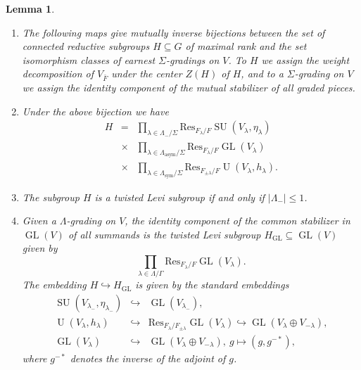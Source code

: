 \documentclass{article}
\def\tx#1{\textrm{#1}}
\DeclareMathOperator{\GL}{GL}
\newtheorem{lem}[thm]{Lemma}
\theoremstyle{definition}
\numberwithin{equation}{subsection}
\renewcommand{\-}{\hyp{}}
\DeclareMathOperator{\SU}{SU}
\DeclareMathOperator{\U}{U}
\begin{document}
\begin{lem}\label{lem:Levivsgrading}
	\begin{enumerate}
		\item The following maps give mutually inverse bijections between the set of connected reductive subgroups $H \subseteq G$ of maximal rank and the set isomorphism classes of earnest $\Sigma$-gradings on $V$. To $H$ we assign the weight decomposition of $V_{\bar F}$ under the center $Z(H)$ of $H$, and to a $\Sigma$-grading on $V$ we assign the identity component of the mutual stabilizer of all graded pieces.
		\item Under the above bijection we have 
\begin{eqnarray*}
			H&=&\prod_{\lambda \in \Lambda_-/\Sigma} \tx{Res}_{F_\lambda/F}\SU(V_{\lambda},\eta_{\lambda})\\
			&\times&\prod_{\lambda \in \Lambda_\tx{asym}/\Sigma} \tx{Res}_{F_\lambda/F}\GL(V_\lambda)\\
			&\times&\prod_{\lambda \in \Lambda_\tx{sym}/\Sigma} \tx{Res}_{F_{\pm\lambda}/F}\U(V_{\lambda},h_{\lambda}).
		\end{eqnarray*}
\item The subgroup $H$ is a twisted Levi subgroup if and only if $|\Lambda_-| \leq 1$.
		\item Given a $\Lambda$-grading on $V$, the identity component of the common stabilizer in $\GL(V)$ of all summands is the twisted Levi subgroup $H_{\GL} \subseteq \GL(V)$ given by 
		\[ \prod_{\lambda \in \Lambda/\Gamma} \tx{Res}_{F_\lambda/F}\GL(V_\lambda). \]
		The embedding $H \hookrightarrow H_{\GL}$ is given by the standard embeddings
		\begin{eqnarray*}
			\SU(V_{\lambda_-},\eta_{\lambda_-})&\hookrightarrow&\GL(V_{\lambda_-}),\\
			\U(V_{\lambda},h_{\lambda})&\hookrightarrow&\tx{Res}_{F_\lambda/F_{\pm\lambda}}\GL(V_{\lambda}) \hookrightarrow \GL(V_\lambda \oplus V_{-\lambda}),\\
			\GL(V_\lambda)&\hookrightarrow&\GL(V_\lambda \oplus V_{-\lambda}),\ g \mapsto (g,g^{-*}), 
		\end{eqnarray*}
		where $g^{-*}$ denotes the inverse of the adjoint of $g$.
	\end{enumerate}
\end{lem}
\end{document}

